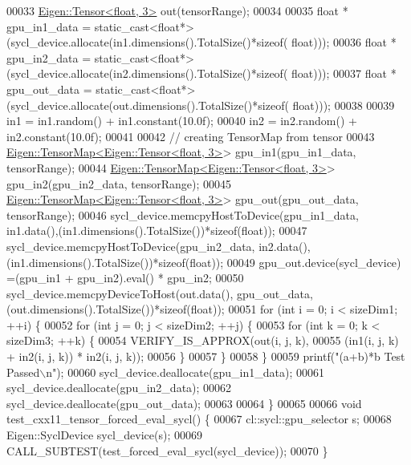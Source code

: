 \begin{DoxyCode}
00033   \hyperlink{class_eigen_1_1_tensor}{Eigen::Tensor<float, 3>} out(tensorRange);
00034 
00035   \textcolor{keywordtype}{float} * gpu\_in1\_data  = \textcolor{keyword}{static\_cast<}\textcolor{keywordtype}{float}*\textcolor{keyword}{>}(sycl\_device.allocate(in1.dimensions().TotalSize()*\textcolor{keyword}{sizeof}(
      float)));
00036   \textcolor{keywordtype}{float} * gpu\_in2\_data  = \textcolor{keyword}{static\_cast<}\textcolor{keywordtype}{float}*\textcolor{keyword}{>}(sycl\_device.allocate(in2.dimensions().TotalSize()*\textcolor{keyword}{sizeof}(
      float)));
00037   \textcolor{keywordtype}{float} * gpu\_out\_data =  \textcolor{keyword}{static\_cast<}\textcolor{keywordtype}{float}*\textcolor{keyword}{>}(sycl\_device.allocate(out.dimensions().TotalSize()*\textcolor{keyword}{sizeof}(
      float)));
00038 
00039   in1 = in1.random() + in1.constant(10.0f);
00040   in2 = in2.random() + in2.constant(10.0f);
00041 
00042   \textcolor{comment}{// creating TensorMap from tensor}
00043   \hyperlink{class_eigen_1_1_tensor_map}{Eigen::TensorMap<Eigen::Tensor<float, 3>}> gpu\_in1(gpu\_in1\_data, 
      tensorRange);
00044   \hyperlink{class_eigen_1_1_tensor_map}{Eigen::TensorMap<Eigen::Tensor<float, 3>}> gpu\_in2(gpu\_in2\_data, 
      tensorRange);
00045   \hyperlink{class_eigen_1_1_tensor_map}{Eigen::TensorMap<Eigen::Tensor<float, 3>}> gpu\_out(gpu\_out\_data, 
      tensorRange);
00046   sycl\_device.memcpyHostToDevice(gpu\_in1\_data, in1.data(),(in1.dimensions().TotalSize())*\textcolor{keyword}{sizeof}(\textcolor{keywordtype}{float}));
00047   sycl\_device.memcpyHostToDevice(gpu\_in2\_data, in2.data(),(in1.dimensions().TotalSize())*\textcolor{keyword}{sizeof}(\textcolor{keywordtype}{float}));
00049   gpu\_out.device(sycl\_device) =(gpu\_in1 + gpu\_in2).eval() * gpu\_in2;
00050   sycl\_device.memcpyDeviceToHost(out.data(), gpu\_out\_data,(out.dimensions().TotalSize())*\textcolor{keyword}{sizeof}(\textcolor{keywordtype}{float}));
00051   \textcolor{keywordflow}{for} (\textcolor{keywordtype}{int} i = 0; i < sizeDim1; ++i) \{
00052     \textcolor{keywordflow}{for} (\textcolor{keywordtype}{int} j = 0; j < sizeDim2; ++j) \{
00053       \textcolor{keywordflow}{for} (\textcolor{keywordtype}{int} k = 0; k < sizeDim3; ++k) \{
00054         VERIFY\_IS\_APPROX(out(i, j, k),
00055                          (in1(i, j, k) + in2(i, j, k)) * in2(i, j, k));
00056       \}
00057     \}
00058   \}
00059   printf(\textcolor{stringliteral}{"(a+b)*b Test Passed\(\backslash\)n"});
00060   sycl\_device.deallocate(gpu\_in1\_data);
00061   sycl\_device.deallocate(gpu\_in2\_data);
00062   sycl\_device.deallocate(gpu\_out\_data);
00063 
00064 \}
00065 
00066 \textcolor{keywordtype}{void} test\_cxx11\_tensor\_forced\_eval\_sycl() \{
00067   cl::sycl::gpu\_selector s;
00068   Eigen::SyclDevice sycl\_device(s);
00069   CALL\_SUBTEST(test\_forced\_eval\_sycl(sycl\_device));
00070 \}
\end{DoxyCode}
